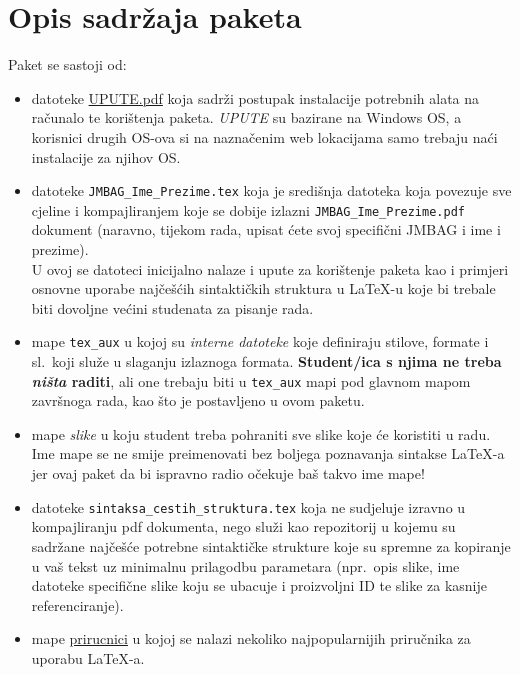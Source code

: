 \section{Opis sadržaja paketa}
\vspace{-2ex}
Paket se sastoji od:
\begin{itemize}
 \item datoteke \href{run:UPUTE.pdf}{{\color{blue} UPUTE.pdf}} koja sadrži postupak instalacije potrebnih alata na računalo te korištenja paketa. \emph{UPUTE} su bazirane na Windows OS, a korisnici drugih OS-ova si na naznačenim web lokacijama samo trebaju naći instalacije za njihov OS.
 \item datoteke \verb|JMBAG_Ime_Prezime.tex| koja je središnja datoteka koja povezuje sve cjeline i kompajliranjem koje se dobije izlazni \verb|JMBAG_Ime_Prezime.pdf| dokument (naravno, tijekom rada, upisat ćete svoj specifični JMBAG i ime i prezime).\\ U ovoj se datoteci inicijalno nalaze i upute za korištenje paketa kao i primjeri osnovne uporabe najčešćih sintaktičkih struktura u \LaTeX-u koje bi trebale biti dovoljne većini studenata za pisanje rada.
 \item mape \verb|tex_aux| u kojoj su \emph{interne datoteke} koje definiraju stilove, formate i sl.\ koji služe u slaganju izlaznoga formata. \textbf{Student/ica s njima ne treba \emph{ništa} raditi}, ali one trebaju biti u \verb|tex_aux| mapi pod glavnom mapom završnoga rada, kao što je postavljeno u ovom paketu.
 \item mape \emph{slike} u koju student treba pohraniti sve slike koje će koristiti u radu. Ime mape se ne smije preimenovati bez boljega poznavanja sintakse \LaTeX-a jer ovaj paket da bi ispravno radio očekuje baš takvo ime mape!
 \item datoteke \verb|sintaksa_cestih_struktura.tex| koja ne sudjeluje izravno u kompajliranju pdf dokumenta, nego služi kao repozitorij u kojemu su sadržane najčešće potrebne sintaktičke strukture koje su spremne za kopiranje u vaš tekst uz minimalnu prilagodbu parametara (npr.\ opis slike, ime datoteke specifične slike koju se ubacuje i proizvoljni ID te slike za kasnije referenciranje).
 \item mape \href{run:prirucnici}{{\color{blue}prirucnici}} u kojoj se nalazi nekoliko najpopularnijih priručnika za uporabu \LaTeX-a. 
\end{itemize}
